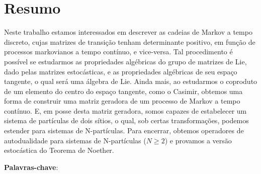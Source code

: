 \chapter*{Resumo}
Neste trabalho estamos interessados em descrever as cadeias de Markov a tempo discreto, cujas
matrizes de transição tenham determinante positivo, em função
de processos markovianos a tempo contínuo, e vice-versa. Tal procedimento é possível se estudarmos 
as propriedades algébricas do grupo de matrizes de Lie, dado pelas matrizes estocásticas, e as propriedades 
algébricas de seu espaço
tangente, o qual será uma álgebra de Lie. 
Ainda mais, ao estudarmos o coproduto
de um elemento do centro do espaço tangente, como o Casimir, obtemos uma forma
de construir uma matriz geradora de um processo de Markov a tempo contínuo.
E, em posse desta matriz geradora, somos capazes de estabelecer um sistema de partículas de dois sítios, o
qual, sob certas transformações, podemos estender para sistemas de N-partículas. Para encerrar,
obtemos operadores de autodualidade para sistemas de N-partículas ($N \geq 2$) e provamos
a versão estocástica do Teorema de Noether.

\vspace{.5cm}
\textbf{Palavras-chave}:\palavraschaves



